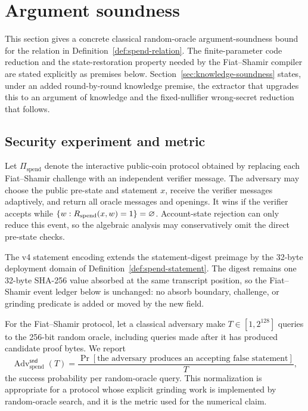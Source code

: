 \section{Argument soundness}
\label{sec:soundness}

This section gives a concrete classical random-oracle argument-soundness
bound for the relation in Definition~\ref{def:spend-relation}.  The
finite-parameter code reduction and the state-restoration property needed by
the Fiat--Shamir compiler are stated explicitly as premises below.
Section~\ref{sec:knowledge-soundness} states, under an added round-by-round
knowledge premise, the extractor that upgrades this to an argument of
knowledge and the fixed-nullifier wrong-secret reduction that follows.

\subsection{Security experiment and metric}

Let \(\Pi_{\mathrm{spend}}\) denote the interactive public-coin protocol obtained by
replacing each Fiat--Shamir challenge with an independent verifier message.
The adversary may choose the public pre-state and statement \(x\), receive the
verifier messages adaptively, and return all oracle messages and openings.  It
wins if the verifier accepts while
\(
  \{w:R_{\mathrm{spend}}(x,w)=1\}=\varnothing
\).
Account-state rejection can only reduce this event, so the algebraic analysis
may conservatively omit the direct pre-state checks.

\begin{remark}
The v4 statement encoding extends the statement-digest preimage by the
32-byte deployment domain of Definition~\ref{def:spend-statement}.  The
digest remains one 32-byte SHA-256 value absorbed at the same transcript
position, so the Fiat--Shamir event ledger below is unchanged: no absorb
boundary, challenge, or grinding predicate is added or moved by the new
field.
\end{remark}

For the Fiat--Shamir protocol, let a classical adversary make
\(T\in[1,2^{128}]\) queries to the 256-bit random oracle, including queries
made after it has produced candidate proof bytes.  We report
\begin{equation}
 \operatorname{Adv}^{\mathsf{snd}}_{\mathrm{spend}}(T)
 =\frac{\Pr[\text{the adversary produces an accepting false statement}]}{T},
 \label{eq:work-normalized-soundness}
\end{equation}
the success probability per random-oracle query.  This normalization is
appropriate for a protocol whose explicit grinding work is implemented by
random-oracle search, and it is the metric used for the numerical claim.

